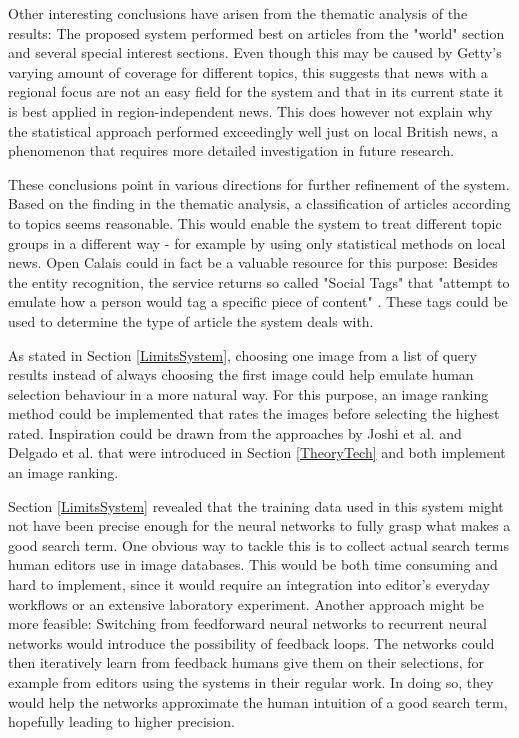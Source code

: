 \documentclass[11pt,a4paper,twoside]{article}
\begin{document}
Other interesting conclusions have arisen from the thematic analysis of the results: The proposed system performed best on articles from the "world" section and several special interest sections. Even though this may be caused by Getty's varying amount of coverage for different topics, this suggests that news with a regional focus are not an easy field for the system and that in its current state it is best applied in region-independent news. This does however not explain why the statistical approach performed exceedingly well just on local British news, a phenomenon that requires more detailed investigation in future research.

\bigskip

These conclusions point in various directions for further refinement of the system. Based on the finding in the thematic analysis, a classification of articles according to topics seems reasonable. This would enable the system to treat different topic groups in a different way - for example by using only statistical methods on local news. Open Calais could in fact be a valuable resource for this purpose: Besides the entity recognition, the service returns so called "Social Tags" that "attempt to emulate how a person would tag a specific piece of content" \cite[p. 11]{ThomsonReuters2018ThomsonGuide}. These tags could be used to determine the type of article the system deals with.

As stated in Section \ref{LimitsSystem}, choosing one image from a list of query results instead of always choosing the first image could help emulate human selection behaviour in a more natural way. For this purpose, an image ranking method could be implemented that rates the images before selecting the highest rated. Inspiration could be drawn from the approaches by Joshi et al. \cite{Joshi2006TheIllustration} and Delgado et al. \cite{Delgado2010AutomatedExperience} that were introduced in Section \ref{TheoryTech} and both implement an image ranking.

Section \ref{LimitsSystem} revealed that the training data used in this system might not have been precise enough for the neural networks to fully grasp what makes a good search term. One obvious way to tackle this is to collect actual search terms human editors use in image databases. This would be both time consuming and hard to implement, since it would require an integration into editor's everyday workflows or an extensive laboratory experiment. Another approach might be more feasible: Switching from feedforward neural networks to recurrent neural networks would introduce the possibility of feedback loops. The networks could then iteratively learn from feedback humans give them on their selections, for example from editors using the systems in their regular work. In doing so, they would help the networks approximate the human intuition of a good search term, hopefully leading to higher precision.
\end{document}

